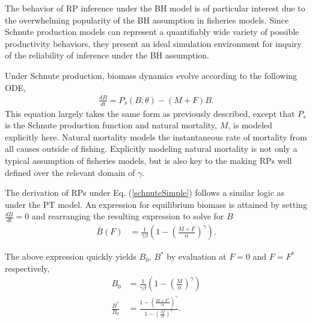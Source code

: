 \documentclass[12pt]{article}
\begin{document}
%
The behavior of RP inference under the BH model is of particular interest due 
to the overwhelming popularity of the BH assumption in fisheries models.
Since Schnute production models can represent a quantifiably wide variety 
of possible productivity behaviors, they present an ideal simulation 
environment for inquiry of the reliability of inference under the BH 
assumption.

%
Under Schnute production, biomass dynamics evolve according to the following ODE, 
%
\begin{align}
\frac{dB}{dt} = P_s(B;\theta) - (M+F)B. \label{schnuteSimple}
\end{align}
%
This equation largely takes the same form as previously described, except 
that $P_s$ is the Schnute production function and natural mortality, $M$, is modeled 
explicitly here. %
Natural mortality models the instantaneous rate of mortality from all causes 
outside of fishing. Explicitly modeling natural mortality is not 
only a typical assumption of fisheries models, but is also key to the making 
RPs well defined over the relevant domain of $\gamma$.



%
The derivation of RPs under Eq. (\ref{schnuteSimple}) follows a similar logic 
as under the PT model. An expression for equilibrium biomass is attained by 
setting $\frac{dB}{dt}=0$ and rearranging the resulting expression to solve 
for $B$ 
%
\begin{align}
\bar{B}(F) &= \frac{1}{\gamma \beta}\left(1-\left(\frac{M+F}{\alpha}\right)^\gamma\right).
\label{BsEq}
\end{align}

%
The above expression quickly yields $B_0$, $B^*$ by evaluation at $F=0$ and $F=F^*$ respectively,
\begin{align}
B_0 &= \frac{1}{\gamma \beta}\left(1-\left(\frac{M}{\alpha}\right)^\gamma\right) \label{B0S}\\
\frac{B^*}{B_0} &= \frac{1-\left(\frac{M+F^*}{\alpha}\right)^\gamma}{ 1-\left(\frac{M}{\alpha}\right)^\gamma }. \label{BratS}
\end{align}
\end{document}
